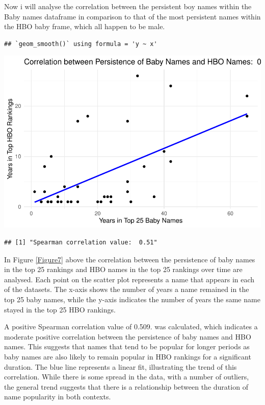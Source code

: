 \documentclass[11pt,preprint, authoryear]{elsarticle}
\let\origfigure\figure
\let\endorigfigure\endfigure
\renewenvironment{figure}[1][2] {
    \expandafter\origfigure\expandafter[H]
} {
    \endorigfigure
}
\numberwithin{equation}{section}
\numberwithin{figure}{section}
\numberwithin{table}{section}
\begin{document}
Now i will analyse the correlation between the persistent boy names
within the Baby names dataframe in comparison to that of the most
persistent names within the HBO baby frame, which all happen to be male.

\begin{verbatim}
## `geom_smooth()` using formula = 'y ~ x'
\end{verbatim}

\begin{figure}

{\centering \includegraphics{README_files/figure-latex/unnamed-chunk-7-1} 

}

\caption{The Correlation Between the Persistence of HBO names and Baby Names.\label{Figure7}}\label{fig:unnamed-chunk-7}
\end{figure}

\begin{verbatim}
## [1] "Spearman correlation value:  0.51"
\end{verbatim}

In Figure \ref{Figure7} above the correlation between the persistence of
baby names in the top 25 rankings and HBO names in the top 25 rankings
over time are analysed. Each point on the scatter plot represents a name
that appears in each of the datasets. The x-axis shows the number of
years a name remained in the top 25 baby names, while the y-axis
indicates the number of years the same name stayed in the top 25 HBO
rankings.

A positive Spearman correlation value of 0.509. was calculated, which
indicates a moderate positive correlation between the persistence of
baby names and HBO names. This suggests that names that tend to be
popular for longer periods as baby names are also likely to remain
popular in HBO rankings for a significant duration. The blue line
represents a linear fit, illustrating the trend of this correlation.
While there is some spread in the data, with a number of outliers, the
general trend suggests that there is a relationship between the duration
of name popularity in both contexts.


\end{document}
